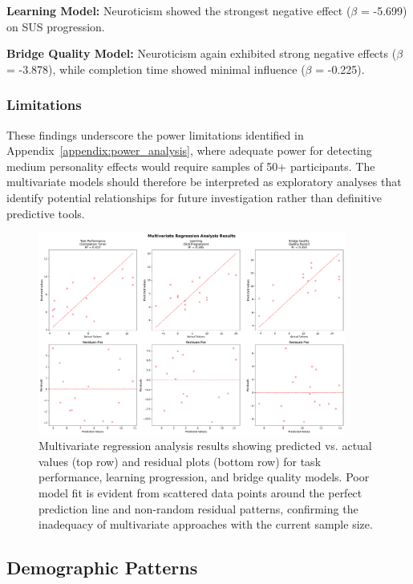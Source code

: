\textbf{Learning Model:} Neuroticism showed the strongest negative effect ($\beta$ = -5.699) on SUS progression.

\textbf{Bridge Quality Model:} Neuroticism again exhibited strong negative effects ($\beta$ = -3.878), while completion time showed minimal influence ($\beta$ = -0.225).

\subsubsection{Limitations}

These findings underscore the power limitations identified in Appendix~\ref{appendix:power_analysis}, where adequate power for detecting medium personality effects would require samples of 50+ participants. The multivariate models should therefore be interpreted as exploratory analyses that identify potential relationships for future investigation rather than definitive predictive tools.

\begin{figure}[htbp]
\centering
\includegraphics[width=0.9\textwidth]{assets/06/multivariate_regression_analysis.pdf}
\caption{Multivariate regression analysis results showing predicted vs. actual values (top row) and residual plots (bottom row) for task performance, learning progression, and bridge quality models. Poor model fit is evident from scattered data points around the perfect prediction line and non-random residual patterns, confirming the inadequacy of multivariate approaches with the current sample size.}
\label{fig:multivariate_regression_analysis}
\end{figure}

\subsection{Demographic Patterns}


